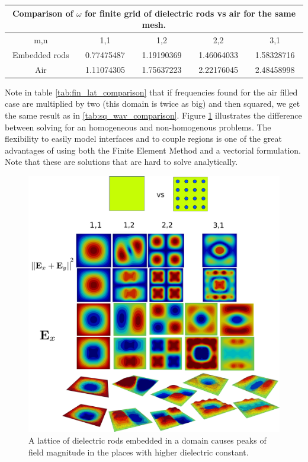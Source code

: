 \begin{center}
\begin{tabular}{|c|c|c|c|c|}
\hline
\multicolumn{5}{|c|}{Comparison of $\omega$ for finite grid of dielectric rods vs air for the same mesh.} \\
\hline 
m,n & 1,1 & 1,2 & 2,2 & 3,1 \\ 
\hline 
Embedded rods & 0.77475487 & 1.19190369 & 1.46064033 & 1.58328716 \\ 
\hline 
Air  & 1.11074305 & 1.75637223 & 2.22176045 & 2.48458998 \\ 
\hline 
\end{tabular}
\label{tab:fin_lat_comparison}
\end{center}

Note in table \ref{tab:fin_lat_comparison} that if frequencies found for the air filled case are multiplied by two (this domain is twice as big) and then squared, we get the same result as in \ref{tab:sq_wav_comparison}. 
Figure \ref{fig:fin_lat_waveguide} illustrates the difference between solving for an homogeneous and non-homogenous problems. The flexibility to easily model interfaces and to couple regions is one of the great advantages of using both the Finite Element Method and a vectorial formulation. Note that these are solutions that are hard to solve analytically.

\begin{figure}
\centering
\includegraphics[scale=0.1]{./img/finite_lattice.pdf}
\caption{A lattice of dielectric rods embedded in a domain causes peaks of field magnitude in the places with higher dielectric constant.}
\label{fig:fin_lat_waveguide}
\end{figure}

